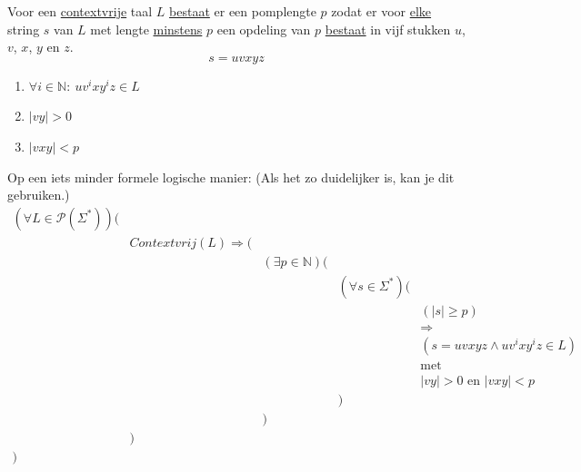 \documentclass[main.tex]{subfiles}
\begin{document}
\begin{lem}
  Voor een \underline{contextvrije} taal $L$ \underline{bestaat} er een pomplengte $p$  zodat er voor \underline{elke} string $s$ van $L$ met lengte \underline{minstens} $p$ een opdeling van $p$ \underline{bestaat} in vijf stukken $u$, $v$, $x$, $y$ en $z$.
  \[ s = uvxyz \]
  \begin{enumerate}
    \item $\forall i \in \mathbb{N}:\ uv^{i}xy^{i}z \in L$
    \item $|vy| > 0$
    \item $|vxy| < p$
  \end{enumerate}
\end{lem}
Op een iets minder formele logische manier: (Als het zo duidelijker is, kan je dit gebruiken.)
\[
\begin{array}{rrrrl}
  (\forall L\in \mathcal{P}(\Sigma^{*})) (&\\
               & Contextvrij(L) \Rightarrow (&\\
               &                             & (\exists p\in \mathbb{N})(&\\
               &                             &                           &(\forall s \in \Sigma^{*})(&\\
               &                             &                           &                           & (|s| \ge p)\\
               &                             &                           &                           & \Rightarrow\\
               &                             &                           &                           & (s = uvxyz \wedge uv^{i}xy^{i}z \in L)\\
               &                             &                           &                           & \text{met}\\
               &                             &                           &                           & |vy| > 0 \text{ en } |vxy| < p\\
               &                             &                           &                          )&\\
               &                             &                          )&\\
               &                            )&\\
              )&\\ 
\end{array}
 \]
\end{document}
